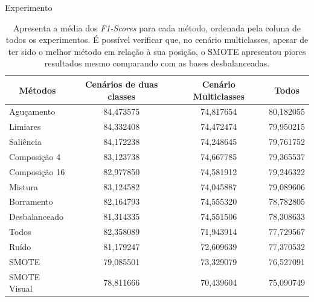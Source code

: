 \documentclass{beamer}
\begin{document}
\begin{frame}{Experimento}
  \begin{table}[!htbp]
  \centering
  \caption{Apresenta a média dos \textit{F1-Scores} para cada método, ordenada pela coluna de todos os experimentos. É possível verificar que, no cenário multiclasses, apesar de ter sido o melhor método em relação à sua posição, o SMOTE apresentou piores resultados mesmo comparando com as bases desbalanceadas.}
  \label{tab:allfscore}
  \begin{tabular}{|l|c|c|c|}
  \hline
  \multicolumn{1}{|c|}{\textbf{Métodos}} & \textbf{Cenários de duas classes} & \textbf{Cenário Multiclasses} & \textbf{Todos} \\ \hline
  Aguçamento                             & 84,473575                         & 74,817654                     & 80,182055      \\ \hline
  Limiares                               & 84,332408                         & 74,472474                     & 79,950215      \\ \hline
  Saliência                              & 84,172238                         & 74,248645                     & 79,761752      \\ \hline
  Composição 4                           & 83,123738                         & 74,667785                     & 79,365537      \\ \hline
  Composição 16                          & 82,977850                         & 74,581912                     & 79,246322      \\ \hline
  Mistura                                & 83,124582                         & 74,045887                     & 79,089606      \\ \hline
  Borramento                             & 82,164793                         & 74,555320                     & 78,782805      \\ \hline
  Desbalanceado                          & 81,314335                         & 74,551506                     & 78,308633      \\ \hline
  Todos                                  & 82,358089                         & 71,943914                     & 77,729567      \\ \hline
  Ruído                                  & 81,179247                         & 72,609639                     & 77,370532      \\ \hline
  SMOTE                                  & 79,085501                         & 73,329079                     & 76,527091      \\ \hline
  SMOTE Visual                           & 78,811666                         & 70,439604                     & 75,090749      \\ \hline
  \end{tabular}
  \end{table}
\end{frame}
\end{document}
